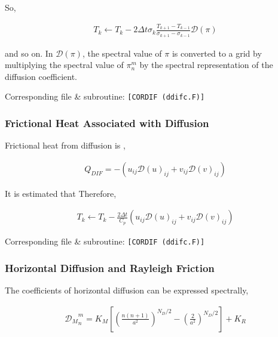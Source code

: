 So,

\begin{eqnarray}
  T_k \leftarrow  T_k
       -  2 \Delta t
        \sigma_{k} \frac{T_{k+1}-T_{k-1}}{\sigma_{k+1} - \sigma_{k-1}}
        {\mathcal D}(\pi)
\end{eqnarray}

and so on. In \({\mathcal D}(\pi)\), the spectral value of \(\pi\) is converted to a grid by multiplying the spectral value of \(\pi_n^m\) by the spectral representation of the diffusion coefficient.

Corresponding file \& subroutine: \texttt{{[}CORDIF\ (ddifc.F){]}}

\hypertarget{frictional-heat-associated-with-diffusion}{%
\subsubsection{Frictional Heat Associated with Diffusion}\label{frictional-heat-associated-with-diffusion}}

Frictional heat from diffusion is ,

\begin{eqnarray}
  Q_{DIF} = - \left( u_{ij} {\mathcal D}(u)_{ij}
                   + v_{ij} {\mathcal D}(v)_{ij} \right)
\end{eqnarray}

It is estimated that Therefore,

\begin{eqnarray}
  T_k \leftarrow  T_k
       -  \frac{2 \Delta t}{C_p}
           \left( u_{ij} {\mathcal D}(u)_{ij}
                 + v_{ij} {\mathcal D}(v)_{ij} \right)
\end{eqnarray}

Corresponding file \& subroutine: \texttt{{[}CORDIF\ (ddifc.F){]}}

\hypertarget{horizontal-diffusion-and-rayleigh-friction}{%
\subsubsection{Horizontal Diffusion and Rayleigh Friction}\label{horizontal-diffusion-and-rayleigh-friction}}

The coefficients of horizontal diffusion can be expressed spectrally,

\begin{eqnarray}
 {{\mathcal D}_M}_n^m = K_M
                      \left[ \left( \frac{n(n+1)}{a^2} \right)^{N_D/2}
                                - \left( \frac{2}{a^2} \right)^{N_D/2}
                      \right]
                  + K_R
\end{eqnarray}

